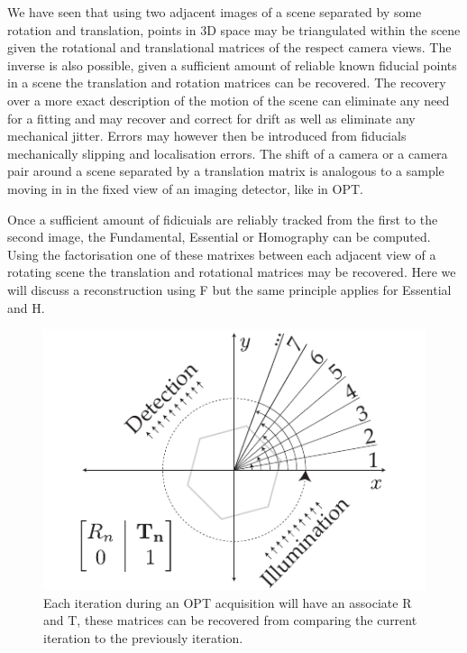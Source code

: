 We have seen that using two adjacent images of a scene separated by some rotation and translation, points in 3D space may be triangulated within the scene given the rotational and translational matrices of the respect camera views.
The inverse is also possible, given a sufficient amount of reliable known fiducial points in a scene the translation and rotation matrices can be recovered.
The recovery over a more exact description of the motion of the scene can eliminate any need for a fitting and may recover and correct for drift as well as eliminate any mechanical jitter.
Errors may however then be introduced from fiducials mechanically slipping and localisation errors.
The shift of a camera or a camera pair around a scene separated by a translation matrix is analogous to a sample moving in in the fixed view of an imaging detector, like in OPT.

Once a sufficient amount of fidicuials are reliably tracked from the first to the second image, the Fundamental, Essential or Homography can be computed.
Using the factorisation one of these matrixes between each adjacent view of a rotating scene the translation and rotational matrices may be recovered.
Here we will discuss a reconstruction using \gls{F} but the same principle applies for \gls{Essential} and \gls{H}.

\begin{figure}
  \centering
  \includegraphics{Chapters/flopt/Figs/PDF/flOPT_principle}
  \caption{Each iteration during an OPT acquisition will have an associate \gls{R} and \gls{T}, these matrices can be recovered from comparing the current iteration to the previously iteration.}
\end{figure}

